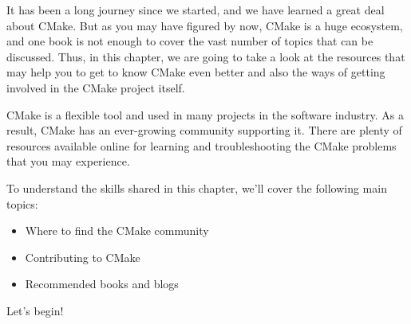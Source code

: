 It has been a long journey since we started, and we have learned a great deal about CMake. But as you may have figured by now, CMake is a huge ecosystem, and one book is not enough to cover the vast number of topics that can be discussed. Thus, in this chapter, we are going to take a look at the resources that may help you to get to know CMake even better and also the ways of getting involved in the CMake project itself.

CMake is a flexible tool and used in many projects in the software industry. As a result, CMake has an ever-growing community supporting it. There are plenty of resources available online for learning and troubleshooting the CMake problems that you may experience.

To understand the skills shared in this chapter, we'll cover the following main topics:

\begin{itemize}
\item 
Where to find the CMake community

\item 
Contributing to CMake

\item 
Recommended books and blogs
\end{itemize}

Let's begin!